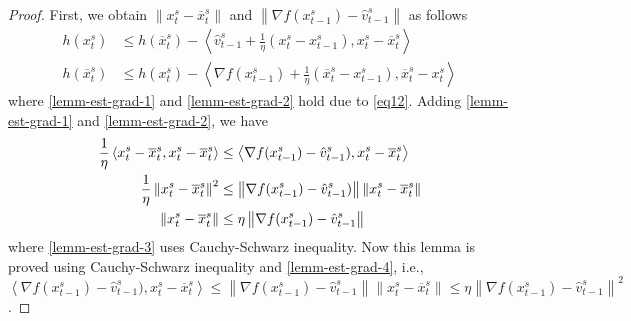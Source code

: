 \documentclass{article}
\newcommand{\norm}[1]{\left\lVert#1\right\rVert}
\newcommand{\Iprod}[2]{\left\langle #1,#2\right\rangle}
\theoremstyle{definition}
\theoremstyle{remark}
\begin{document}
\begin{proof}
First, we obtain $\norm{x_{t}^s-\overline{x}_{t}^s}$ and $\norm{\nabla f(x_{t-1}^s)-\hat{v}_{t-1}^s}$ as follows 
\begin{align}
h(x_t^s)&\leq h(\overline{x}_t^s) - \Iprod{\hat{v}_{t-1}^s+\frac{1}{\eta}(x_t^s-x_{t-1}^s)}{x_t^s-\overline{x}_t^s}\label{lemm-est-grad-1}\\
h(\overline{x}_t^s)&\leq h({x}_t^s) - \Iprod{\nabla f(x_{t-1}^s)+\frac{1}{\eta}(\overline{x}_t^s-x_{t-1}^s)}{\overline{x}_t^s-x_t^s}\label{lemm-est-grad-2}
\end{align}
where \eqref{lemm-est-grad-1} and \eqref{lemm-est-grad-2} hold due to \eqref{eq12}. Adding \eqref{lemm-est-grad-1} and \eqref{lemm-est-grad-2}, we have 
\begin{align}
\frac{1}{\eta}\Iprod{x_t^s -\overline{x}_t^s}{x_t^s -\overline{x}_t^s} &\leq \Iprod{\nabla f(x_{t-1}^s) -\hat{v}_{t-1}^s)}{x_t^s -\overline{x}_t^s}\notag\\
\frac{1}{\eta}\norm{x_t^s -\overline{x}_t^s}^2 &\leq \norm{\nabla f(x_{t-1}^s) -\hat{v}_{t-1}^s)}\norm{x_t^s -\overline{x}_t^s}\label{lemm-est-grad-3}\\
\norm{x_t^s -\overline{x}_t^s} &\leq \eta\norm{\nabla f(x_{t-1}^s) -\hat{v}_{t-1}^s}\label{lemm-est-grad-4}
\end{align}
where \eqref{lemm-est-grad-3} uses Cauchy-Schwarz inequality. Now this lemma is proved using Cauchy-Schwarz inequality and \eqref{lemm-est-grad-4}, i.e., $\Iprod{\nabla f(x_{t-1}^s) -\hat{v}_{t-1}^s)}{x_t^s -\overline{x}_t^s} \leq \norm{\nabla f(x_{t-1}^s)-\hat{v}_{t-1}^s} \norm{x_t^s -\overline{x}_t^s} \leq \eta\norm{\nabla f(x_{t-1}^s)-\hat{v}_{t-1}^s}^2$.
\end{proof}


\end{document}
